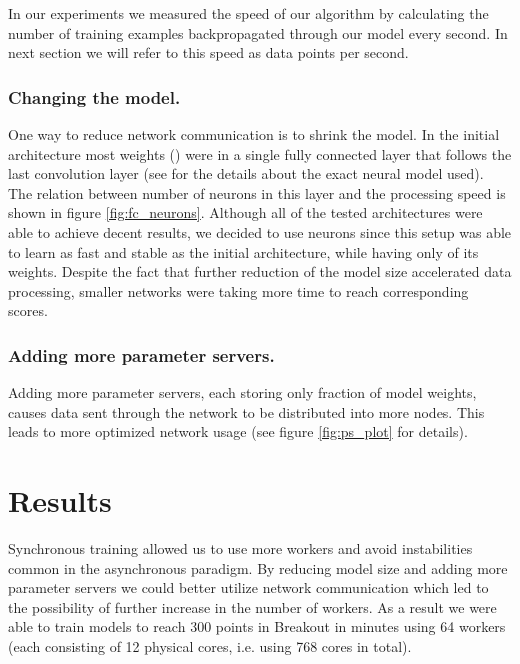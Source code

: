 \documentclass{llncs}
\begin{document}
In our experiments we measured the speed of our algorithm by calculating the number of training examples backpropagated through our model every second. In next section we will refer to this speed as data points per second.

\subsubsection{Changing the model.} One way to reduce network communication is to shrink the model. In the initial architecture most weights () were in a single fully connected layer that follows the last convolution layer (see \cite{ba3c_paper} for the details about the exact neural model used). The relation between number of neurons in this layer and the processing speed is shown in figure \ref{fig:fc_neurons}. Although all of the tested architectures were able to achieve decent results, we decided to use  neurons since this setup was able to learn as fast and stable as the initial architecture, while having only  of its weights. Despite the fact that further reduction of the model size accelerated data processing, smaller networks were taking more time to reach corresponding scores.


\subsubsection{Adding more parameter servers.}

Adding more parameter servers, each storing only fraction of model weights, causes data sent through the network to be distributed into more nodes. This leads to more optimized network usage (see figure \ref{fig:ps_plot} for details).
 \section{Results}\label{results}
Synchronous training allowed us to use more workers and avoid instabilities common in the asynchronous paradigm. By reducing model size and adding more parameter servers we could better utilize network communication which led to the possibility of further increase in the number of workers. As a result we were able to train models to reach 300 points in Breakout in  minutes using 64 workers (each consisting of 12 physical cores, i.e. using 768 cores in total).
\end{document}
